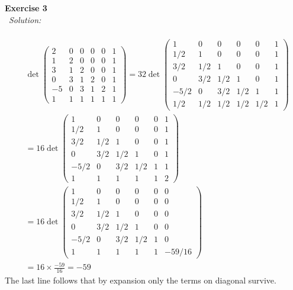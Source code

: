 \documentclass[12pt]{article}
\def\es#1#2{{\bf Exercise #1}\\~{\it Solution:}\\~#2\\[1em]}
\def\ff#1#2{\frac{#1}{#2}}
\newcommand{\eq}[1]{\begin{align*}#1\end{align*}}
\begin{document}
\es{3}{
	\eq{
	&\det\begin{pmatrix}
	2&0&0&0&0&1\\
	1&2&0&0&0&1\\
	3&1&2&0&0&1\\
	0&3&1&2&0&1\\
	-5&0&3&1&2&1\\
	1&1&1&1&1&1
	\end{pmatrix}
	=
	32\det\begin{pmatrix}
	1    &0    &0   &0   &0&1\\
	1/2 &1    &0   &0   &0&1\\
	3/2 &1/2 &1   &0   &0&1\\
	0    &3/2    &1/2&1   &0&1\\
	-5/2&0    &3/2   &1/2&1&1\\
	1/2 &1/2 &1/2   &1/2&1/2&1
	\end{pmatrix}\\
	&
	=16\det\begin{pmatrix}
	1    &0    &0   &0   &0&1\\
	1/2 &1    &0   &0   &0&1\\
	3/2 &1/2 &1   &0   &0&1\\
	0    &3/2    &1/2&1   &0&1\\
	-5/2&0    &3/2   &1/2&1&1\\
	1 &1 &1   &1 &1&2
	\end{pmatrix}\\
	&=16\det\begin{pmatrix}
	1    &0    &0   &0   &0&0\\
	1/2 &1    &0   &0   &0&0\\
	3/2 &1/2 &1   &0   &0&0\\
	0    &3/2    &1/2&1   &0&0\\
	-5/2&0    &3/2   &1/2&1&0\\
	1 &1 &1   &1 &1&-59/16
	\end{pmatrix}\\
	&=16\times\ff{-59}{16}=-59
	}
The last line follows that by expansion only the terms on diagonal survive.
}
\end{document}
